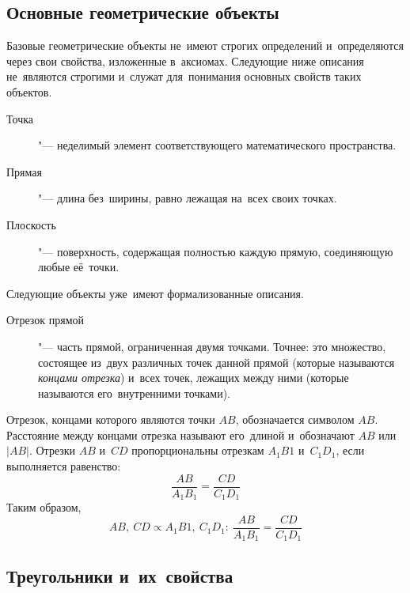 \documentclass[]{scrartcl}
\begin{document}
\subsection{Основные геометрические объекты}\label{main-figures}
Базовые геометрические объекты не~имеют строгих определений и~определяются через свои свойства, изложенные в~аксиомах. Следующие ниже описания не~являются строгими и~служат для~понимания основных свойств таких объектов.
\begin{description}
	\item[Точка] "--- неделимый элемент соответствующего математического пространства.
\end{description}
\begin{description}
	\item[Прямая] "--- длина без~ширины, равно лежащая на~всех своих точках.
\end{description}
\begin{description}
	\item[Плоскость] "--- поверхность, содержащая полностью каждую прямую, соединяющую любые её~точки.
\end{description}
Следующие объекты уже~имеют формализованные описания.
\begin{description}
	\item[Отрезок прямой] "--- часть прямой, ограниченная двумя точками. Точнее: это множество, состоящее из~двух различных точек данной прямой (которые называются \emph{концами отрезка}) и~всех точек, лежащих между ними (которые называются его~внутренними точками).
\end{description}
Отрезок, концами которого являются точки  ${\displaystyle A} {\displaystyle B}$, обозначается символом ${\displaystyle AB}$. Расстояние между концами отрезка называют его~длиной и~обозначают ${\displaystyle AB}$ или~${\displaystyle |AB|}$.
Отрезки ${\displaystyle AB}$ и~${\displaystyle CD}$ пропорциональны отрезкам ${\displaystyle A_{1}B{1}}$ и~${\displaystyle C_{1}D_{1}}$, если выполняется равенство:
\begin{equation}\label{eq:prog-segments-1}
\frac{AB}{A_{1}B_{1}} = \frac{CD}{C_{1}D_{1}}
\end{equation}
Таким образом,
\begin{equation}\label{eq:prog-segments-2}
AB,\ CD \propto A_{1}B{1},\ C_{1}D_{1}:\ \frac{AB}{A_{1}B_{1}} = \frac{CD}{C_{1}D_{1}} 
\end{equation}



\subsection{Треугольники и~их~свойства}\label{triangles}
\end{document}
